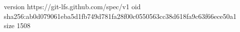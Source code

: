 version https://git-lfs.github.com/spec/v1
oid sha256:ab0d079061eba5d1fb749d781fa28f00c0550563cc38d618fa9c63f66ece50a1
size 1508
